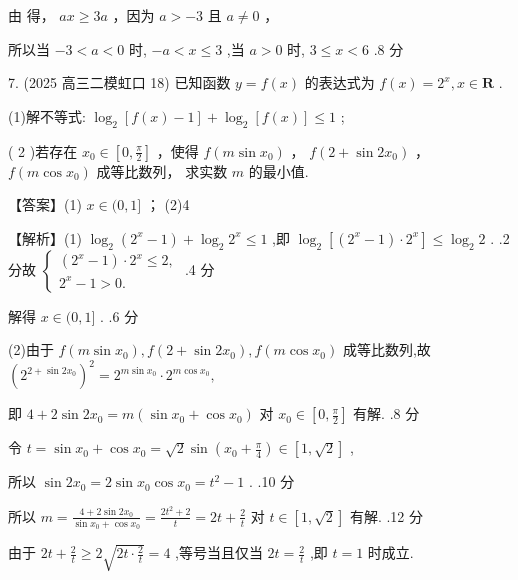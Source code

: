 \documentclass[10pt]{article}
\newcommand*\circled[1]{\tikz[baseline=(char.base)]{\node[shape=circle,draw,inner sep=1.5pt] (char) {\small #1};}}
\begin{document}
由 \circled{1} 得， \({ax} \geq  {3a}\) ，因为 \(a >  - 3\) 且 \(a \neq  0\) ，

所以当 \(- 3 < a < 0\) 时, \(- a < x \leq  3\) ,当 \(a > 0\) 时, \(3 \leq  x < 6\) .8 分

7. (2025 高三二模虹口 18) 已知函数 \(y = f\left( x\right)\) 的表达式为 \(f\left( x\right)  = {2}^{x},x \in  \mathbf{R}\) .

(1)解不等式: \({\log }_{2}\left\lbrack  {f\left( x\right)  - 1}\right\rbrack   + {\log }_{2}\left\lbrack  {f\left( x\right) }\right\rbrack   \leq  1\) ;

( 2 )若存在 \({x}_{0} \in  \left\lbrack  {0,\frac{\pi }{2}}\right\rbrack\) ，使得 \(f\left( {m\sin {x}_{0}}\right)\) ， \(f\left( {2 + \sin {2{x}_{0}}}\right)\) ， \(f\left( {m\cos {x}_{0}}\right)\) 成等比数列， 求实数 \(m\) 的最小值.

【答案】(1) \(x \in  (0,1\rbrack\) ； (2)4

【解析】(1) \({\log }_{2}\left( {{2}^{x} - 1}\right)  + {\log }_{2}{2}^{x} \leq  1\) ,即 \({\log }_{2}\left\lbrack  {\left( {{2}^{x} - 1}\right)  \cdot  {2}^{x}}\right\rbrack   \leq  {\log }_{2}2\) . .2 分故 \(\left\{  \begin{array}{l} \left( {{2}^{x} - 1}\right)  \cdot  {2}^{x} \leq  2, \\  {2}^{x} - 1 > 0. \end{array}\right.\) .4 分

解得 \(x \in  (0,1\rbrack\) . .6 分

(2)由于 \(f\left( {m\sin {x}_{0}}\right) ,f\left( {2 + \sin 2{x}_{0}}\right) ,f\left( {m\cos {x}_{0}}\right)\) 成等比数列,故 \({\left( {2}^{2 + \sin 2{x}_{0}}\right) }^{2} = {2}^{m\sin {x}_{0}} \cdot  {2}^{m\cos {x}_{0}},\)

即 \(4 + 2\sin 2{x}_{0} = m\left( {\sin {x}_{0} + \cos {x}_{0}}\right)\) 对 \({x}_{0} \in  \left\lbrack  {0,\frac{\pi }{2}}\right\rbrack\) 有解. .8 分

令 \(t = \sin {x}_{0} + \cos {x}_{0} = \sqrt{2}\sin \left( {{x}_{0} + \frac{\pi }{4}}\right)  \in  \left\lbrack  {1,\sqrt{2}}\right\rbrack\) ,

所以 \(\sin 2{x}_{0} = 2\sin {x}_{0}\cos {x}_{0} = {t}^{2} - 1\) . .10 分

所以 \(m = \frac{4 + 2\sin 2{x}_{0}}{\sin {x}_{0} + \cos {x}_{0}} = \frac{2{t}^{2} + 2}{t} = {2t} + \frac{2}{t}\) 对 \(t \in  \left\lbrack  {1,\sqrt{2}}\right\rbrack\) 有解. .12 分

由于 \({2t} + \frac{2}{t} \geq  2\sqrt{{2t} \cdot  \frac{2}{t}} = 4\) ,等号当且仅当 \({2t} = \frac{2}{t}\) ,即 \(t = 1\) 时成立.
\end{document}
